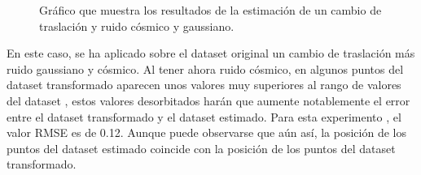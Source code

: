 \begin{figure}[H]
\begin{center}
\hspace{0.5cm}

\end{center}

\caption{Gráfico que muestra los resultados de la estimación de un cambio de traslación y ruido cósmico y gaussiano.}
\end{figure}
En este caso, se ha aplicado sobre el dataset original un cambio de traslación más ruido gaussiano y cósmico. Al tener ahora ruido cósmico, en algunos puntos del dataset transformado aparecen unos valores muy superiores al rango de valores del dataset , estos valores desorbitados harán que aumente notablemente el error entre el dataset transformado y el dataset estimado. Para esta experimento , el valor RMSE es de 0.12. Aunque puede observarse que aún así, la posición de los puntos del dataset estimado coincide con la posición de los puntos del dataset transformado.



